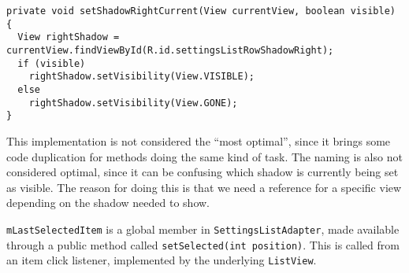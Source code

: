 \begin{lstlisting}[caption={One of three methods setting the visibility of shadows related to the selected list item.}, label={lst:settingslistadapter:shadow}]
private void setShadowRightCurrent(View currentView, boolean visible) {
  View rightShadow = currentView.findViewById(R.id.settingsListRowShadowRight);
  if (visible)
    rightShadow.setVisibility(View.VISIBLE);
  else
    rightShadow.setVisibility(View.GONE);
}
\end{lstlisting}

This implementation is not considered the ``most optimal'', since it brings some code duplication for methods doing the same kind of task.
The naming is also not considered optimal, since it can be confusing which shadow is currently being set as visible.
The reason for doing this is that we need a reference for a specific view depending on the shadow needed to show.

\lstinline|mLastSelectedItem| is a global member in \lstinline|SettingsListAdapter|, made available through a public method called \lstinline|setSelected(int position)|.
This is called from an item click listener, implemented by the underlying \lstinline|ListView|.

